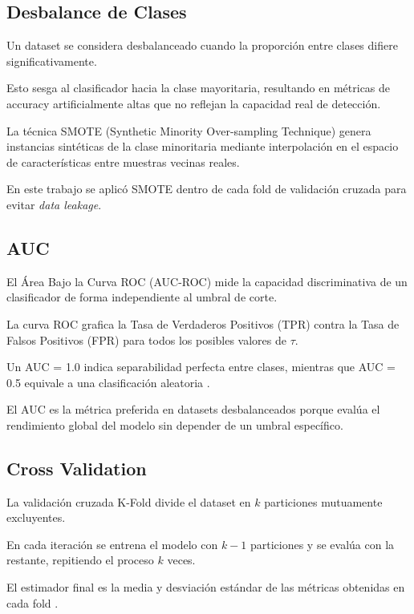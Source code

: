 \documentclass[12pt]{article}
\begin{document}
\subsection{Desbalance de Clases}

Un dataset se considera desbalanceado cuando la proporción entre clases difiere significativamente.

Esto sesga al clasificador hacia la clase mayoritaria, resultando en métricas de accuracy artificialmente altas que no reflejan la capacidad real de detección.

La técnica SMOTE (Synthetic Minority Over-sampling Technique) genera instancias sintéticas de la clase minoritaria mediante interpolación en el espacio de características entre muestras vecinas reales.

En este trabajo se aplicó SMOTE dentro de cada fold de validación cruzada para evitar \textit{data leakage}.

\subsection{AUC}

El Área Bajo la Curva ROC (AUC-ROC) mide la capacidad discriminativa de un clasificador de forma independiente al umbral de corte.

La curva ROC grafica la Tasa de Verdaderos Positivos (TPR) contra la Tasa de Falsos Positivos (FPR) para todos los posibles valores de $\tau$.

Un AUC = 1.0 indica separabilidad perfecta entre clases, mientras que AUC = 0.5 equivale a una clasificación aleatoria \cite{fawcett2006introduction}.

El AUC es la métrica preferida en datasets desbalanceados porque evalúa el rendimiento global del modelo sin depender de un umbral específico.

\subsection{Cross Validation}

La validación cruzada K-Fold divide el dataset en $k$ particiones mutuamente excluyentes.

En cada iteración se entrena el modelo con $k-1$ particiones y se evalúa con la restante, repitiendo el proceso $k$ veces.

El estimador final es la media y desviación estándar de las métricas obtenidas en cada fold \cite{kohavi1995study}.
\end{document}
